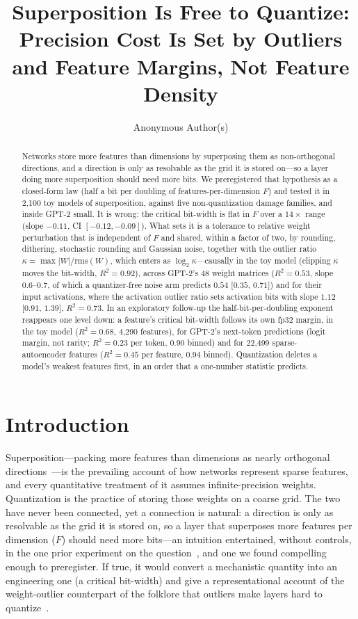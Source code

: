 \documentclass{article}
\title{Superposition Is Free to Quantize: Precision Cost Is Set by Outliers and Feature Margins, Not Feature Density}
\author{Anonymous Author(s)}
\begin{document}
\nolinenumbers
\maketitle

\begin{abstract}
Networks store more features than dimensions by superposing them as non-orthogonal directions, and a direction is only
as resolvable as the grid it is stored on---so a layer doing more superposition should need more bits. We preregistered
that hypothesis as a closed-form law (half a bit per doubling of features-per-dimension $F$) and tested it in 2{,}100
toy models of superposition, against five non-quantization damage families, and inside GPT-2 small. It is wrong:
the critical bit-width is flat in $F$ over a $14\times$ range (slope $-0.11$, CI $[-0.12,-0.09]$). What sets it is a
tolerance to relative weight perturbation that is independent of $F$ and shared, within a factor of two, by rounding,
dithering, stochastic rounding and Gaussian noise, together with the outlier ratio $\kappa=\max|W|/\mathrm{rms}(W)$, which
enters as $\log_2\kappa$---causally in the toy model (clipping $\kappa$ moves the bit-width, $R^2=0.92$), across GPT-2's 48 weight matrices
($R^2=0.53$, slope $0.6$--$0.7$, of which a quantizer-free noise arm predicts $0.54$ [$0.35$, $0.71$]) and for their input
activations, where the activation outlier ratio sets activation bits with slope $1.12$ [$0.91$, $1.39$], $R^2=0.73$. In an exploratory follow-up the half-bit-per-doubling exponent reappears one level down: a feature's critical
bit-width follows its own fp32 margin, in the toy model ($R^2=0.68$, 4{,}290 features), for GPT-2's next-token predictions
(logit margin, not rarity; $R^2 = 0.23$ per token, $0.90$ binned) and for 22{,}499 sparse-autoencoder features ($R^2=0.45$
per feature, $0.94$ binned). Quantization deletes a model's weakest features first, in an order that a one-number
statistic predicts.
\end{abstract}

\section{Introduction}
Superposition---packing more features than dimensions as nearly orthogonal directions~\cite{elhage2022toy}---is the
prevailing account of how networks represent sparse features, and every quantitative treatment of it assumes
infinite-precision weights. Quantization is the practice of storing those weights on a coarse grid. The two have never
been connected, yet a connection is natural: a direction is only as resolvable as the grid it is stored on, so a layer
that superposes more features per dimension ($F$) should need more bits---an intuition entertained, without controls, in
the one prior experiment on the question~\cite{bitnets}, and one we found compelling enough to preregister. If true, it
would convert a mechanistic quantity into an engineering one (a critical bit-width) and give a representational account
of the weight-outlier counterpart of the folklore that outliers make layers hard to quantize~\cite{dettmers2022,xiao2023,lin2024awq}.
\end{document}
